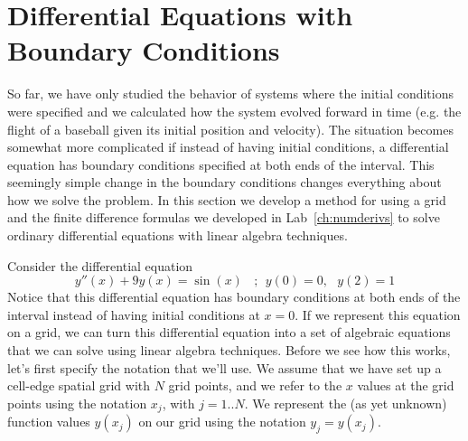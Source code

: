 \chapter{Differential Equations with Boundary Conditions}
\label{Lab:10}


So far, we have only studied the behavior of systems where the initial
conditions were specified and we calculated how the system evolved
forward in time (e.g. the flight of a baseball given its initial
position and velocity).  The situation becomes somewhat more
complicated if instead of having initial conditions, a differential
equation has boundary conditions specified at both ends of the
interval. This seemingly simple change in the boundary conditions
changes everything about how we solve the problem.  In this section we
develop a method for using a grid and the finite difference formulas
we developed in Lab~\ref{ch:numderivs} to solve ordinary differential
equations with linear algebra techniques.


Consider the differential equation
\begin{equation}
    y''(x) + 9 y(x) = \sin(x)~~~~;~~y(0)=0,~~~y(2)=1 \label{ode1}
\end{equation}
 Notice that this differential equation has
boundary conditions at both ends of the interval instead of having
initial conditions at $x=0$.  If we represent this equation on a
grid, we can turn this differential equation into a set of
algebraic equations that we can solve using linear algebra
techniques. Before we see how this works, let's first specify the
notation that we'll use. We assume that we have set up a cell-edge
spatial grid with $N$ grid points, and we refer to the $x$ values
at the grid points using the notation $x_j$, with $j=1..N$. We
represent the (as yet unknown) function values $y(x_j)$ on our grid
using the notation $y_j=y(x_j)$.

